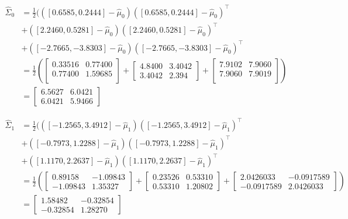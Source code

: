 \documentclass{jhwhw}
\newcommand{\Hat}[1]{\expandafter\hat#1}
\begin{document}
    \begin{align*}
	\Hat{\Sigma}_0 &= \frac{1}{2}(
	    ([0.6585, 0.2444] - \Hat{\mu}_0)([0.6585, 0.2444] - \Hat{\mu}_0)^\intercal &\\
	    &+ ([2.2460, 0.5281] - \Hat{\mu}_0)([2.2460, 0.5281] - \Hat{\mu}_0)^\intercal &\\
	    &+ ([-2.7665, -3.8303] - \Hat{\mu}_0)([-2.7665, -3.8303] - \Hat{\mu}_0)^\intercal &\\
	    &= 
		\frac{1}{2} (
		    \begin{bmatrix}
			0.33516 & 0.77400 \\
			0.77400 & 1.59685 \\
		    \end{bmatrix}
		    +
		    \begin{bmatrix}
			4.8400 & 3.4042 \\
			3.4042 & 2.394
		    \end{bmatrix}
		    +
		    \begin{bmatrix}
			7.9102 & 7.9060 \\
			7.9060 & 7.9019 \\
		    \end{bmatrix}
		) &\\
	    &=
		\begin{bmatrix}
		    6.5627 & 6.0421 \\
		    6.0421 & 5.9466
		\end{bmatrix}
    \end{align*}

    \begin{align*}
	\Hat{\Sigma}_1 &= \frac{1}{2}(
	    ([-1.2565, 3.4912] - \Hat{\mu}_1)([-1.2565, 3.4912] - \Hat{\mu}_1)^\intercal &\\
	    &+ ([-0.7973, 1.2288] - \Hat{\mu}_1)([-0.7973, 1.2288] - \Hat{\mu}_1)^\intercal &\\
	    &+ ([1.1170, 2.2637] - \Hat{\mu}_1)([1.1170, 2.2637] - \Hat{\mu}_1)^\intercal &\\
	    &= 
		\frac{1}{2} (
		    \begin{bmatrix}
			0.89158 & -1.09843 \\
			-1.09843 & 1.35327
		    \end{bmatrix}
		    +
		    \begin{bmatrix}
			0.23526 & 0.53310 \\
			0.53310 & 1.20802 
		    \end{bmatrix}
		    +
		    \begin{bmatrix}
			2.0426033 & -0.0917589 \\
			-0.0917589 & 2.0426033
		    \end{bmatrix}
		) &\\
	    &=
		\begin{bmatrix}
		    1.58482 & -0.32854 \\
		    -0.32854 & 1.28270 
		\end{bmatrix}
    \end{align*}
\end{document}
